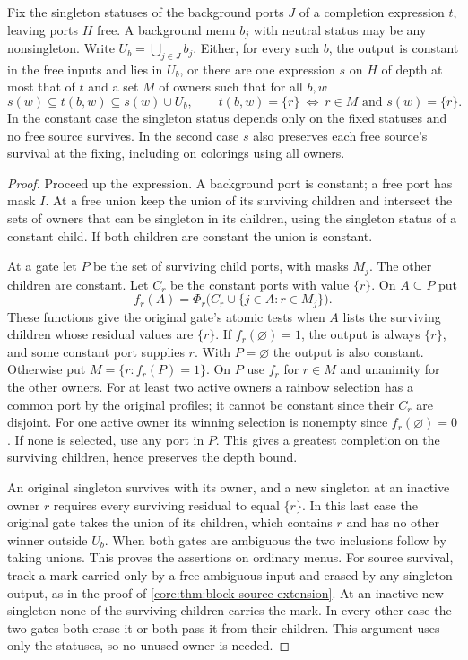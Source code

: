 \begin{theorem}\label{core:thm:completion-erasure}
Fix the singleton statuses of the background ports $J$ of a completion
expression $t$, leaving ports $H$ free. A background menu $b_j$ with
neutral status may be any nonsingleton. Write $U_b=\bigcup_{j\in J}b_j$.
Either, for every such $b$, the output is constant in the free inputs
and lies in $U_b$, or there are one expression $s$ on $H$ of depth at
most that of $t$ and a set $M$ of owners such that for all $b,w$
\[
 s(w)\subseteq t(b,w)\subseteq s(w)\cup U_b,\qquad
 t(b,w)=\{r\}\ \Longleftrightarrow\ r\in M\text{ and }s(w)=\{r\}.
\]
In the constant case the singleton status depends only on the fixed
statuses and no free source survives. In the second case $s$ also preserves each free source's
survival at the fixing, including on colorings using all owners.
\end{theorem}
\begin{proof}
Proceed up the expression. A background port is constant; a free port
has mask $I$. At a free union keep the union of its surviving children
and intersect the sets of owners that can be singleton in its children,
using the singleton status of a constant child. If both children are
constant the union is constant.

At a gate let $P$ be the set of surviving child ports, with masks $M_j$.
The other children are constant. Let $C_r$ be the constant ports with
value $\{r\}$. On $A\subseteq P$ put
\[
 f_r(A)=\Phi_r\bigl(C_r\cup\{j\in A:r\in M_j\}\bigr).
\]
These functions give the original gate's atomic tests when $A$ lists
the surviving children whose residual values are $\{r\}$.
If $f_r(\varnothing)=1$, the output is always $\{r\}$, and some
constant port supplies $r$. With $P=\varnothing$ the output is also
constant. Otherwise put $M=\{r:f_r(P)=1\}$. On $P$ use $f_r$ for
$r\in M$ and unanimity for the other owners. For at least two active
owners a rainbow selection has a common port by the original profiles;
it cannot be constant since their $C_r$ are disjoint. For one active
owner its winning selection is nonempty since $f_r(\varnothing)=0$.
If none is selected, use any port in $P$. This gives a greatest
completion on the surviving children, hence preserves the depth bound.

An original singleton survives with its owner, and a new singleton
at an inactive owner $r$ requires every surviving residual to equal
$\{r\}$. In this last case the original gate takes the union of its
children, which contains $r$ and has no other winner outside $U_b$.
When both gates are ambiguous the two inclusions follow by taking
unions. This proves the assertions on ordinary menus. For source
survival, track a mark carried only by a free ambiguous input and
erased by any singleton output, as in the proof of
\cref{core:thm:block-source-extension}. At an inactive new singleton
none of the surviving children carries the mark. In every other case
the two gates both erase it or both pass it from their children.
This argument uses only the statuses, so no unused owner is needed.
\end{proof}

